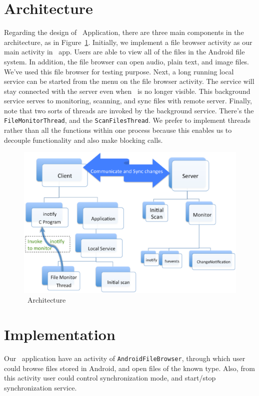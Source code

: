 \section{Architecture}
\label{sec:Architecture}
Regarding the design of \teledroid\ Application, there are three main components in the architecture, as in 
Figure~\ref{fig:architecture}. Initially, we implement a file browser activity as our main activity in \teledroid\ app. 
Users are able to view all of the files in the Android file system. In addition, the file browser can open 
audio, plain text, and image files. We've used this file browser for testing purpose. Next, a long running local 
service can be started from the menu on the file browser activity. The service will stay connected with the server even when 
\teledroid\ is no longer visible. This background service serves to monitoring, scanning, and 
sync files with remote server. Finally, note that two sorts of threads are invoked by the background service. 
There's the \verb+FileMonitorThread+, and the \verb+ScanFilesThread+. We prefer to implement threads rather than all the
functions within one process because this enables us to decouple functionality and also make blocking calls.

\begin{figure}[htp]
\centering
\includegraphics[scale=0.35]{architecture}
\caption{\teledroid\ Architecture}\label{fig:architecture}
\end{figure}

\section{Implementation}
\label{sec:Implementation}
Our \teledroid\ application have an activity of \verb+AndroidFileBrowser+, through which user could browse files stored in 
Android, and open files of the known type. Also, from this activity user could control synchronization mode, and start/stop 
synchronization service. 

